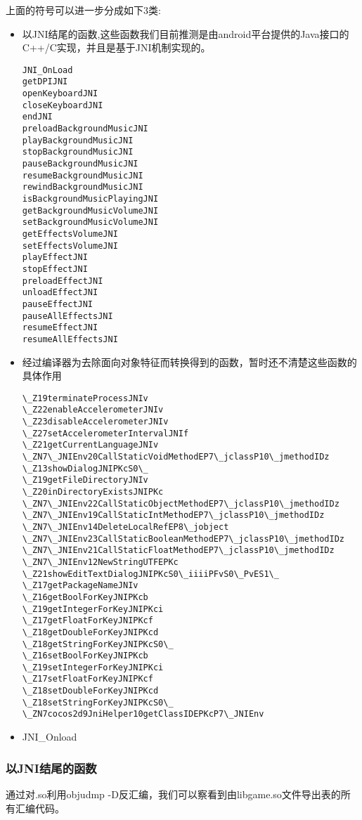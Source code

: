 上面的符号可以进一步分成如下3类:
\begin{itemize}
\item 以JNI结尾的函数,这些函数我们目前推测是由android平台提供的Java接口的C++/C实现，并且是基于JNI机制实现的。
\begin{lstlisting}
JNI_OnLoad
getDPIJNI
openKeyboardJNI
closeKeyboardJNI
endJNI
preloadBackgroundMusicJNI
playBackgroundMusicJNI
stopBackgroundMusicJNI
pauseBackgroundMusicJNI
resumeBackgroundMusicJNI
rewindBackgroundMusicJNI
isBackgroundMusicPlayingJNI
getBackgroundMusicVolumeJNI
setBackgroundMusicVolumeJNI
getEffectsVolumeJNI
setEffectsVolumeJNI
playEffectJNI
stopEffectJNI
preloadEffectJNI
unloadEffectJNI
pauseEffectJNI
pauseAllEffectsJNI
resumeEffectJNI
resumeAllEffectsJNI
\end{lstlisting}
\item 经过编译器为去除面向对象特征而转换得到的函数，暂时还不清楚这些函数的具体作用
\begin{lstlisting}
\_Z19terminateProcessJNIv
\_Z22enableAccelerometerJNIv
\_Z23disableAccelerometerJNIv
\_Z27setAccelerometerIntervalJNIf
\_Z21getCurrentLanguageJNIv
\_ZN7\_JNIEnv20CallStaticVoidMethodEP7\_jclassP10\_jmethodIDz
\_Z13showDialogJNIPKcS0\_
\_Z19getFileDirectoryJNIv
\_Z20inDirectoryExistsJNIPKc
\_ZN7\_JNIEnv22CallStaticObjectMethodEP7\_jclassP10\_jmethodIDz
\_ZN7\_JNIEnv19CallStaticIntMethodEP7\_jclassP10\_jmethodIDz
\_ZN7\_JNIEnv14DeleteLocalRefEP8\_jobject
\_ZN7\_JNIEnv23CallStaticBooleanMethodEP7\_jclassP10\_jmethodIDz
\_ZN7\_JNIEnv21CallStaticFloatMethodEP7\_jclassP10\_jmethodIDz
\_ZN7\_JNIEnv12NewStringUTFEPKc
\_Z21showEditTextDialogJNIPKcS0\_iiiiPFvS0\_PvES1\_
\_Z17getPackageNameJNIv
\_Z16getBoolForKeyJNIPKcb
\_Z19getIntegerForKeyJNIPKci
\_Z17getFloatForKeyJNIPKcf
\_Z18getDoubleForKeyJNIPKcd
\_Z18getStringForKeyJNIPKcS0\_
\_Z16setBoolForKeyJNIPKcb
\_Z19setIntegerForKeyJNIPKci
\_Z17setFloatForKeyJNIPKcf
\_Z18setDoubleForKeyJNIPKcd
\_Z18setStringForKeyJNIPKcS0\_
\_ZN7cocos2d9JniHelper10getClassIDEPKcP7\_JNIEnv
\end{lstlisting}
\item JNI\_Onload
\end{itemize}



\subsubsection{以JNI结尾的函数}
通过对.so利用objudmp -D反汇编，我们可以察看到由libgame.so文件导出表的所有汇编代码。


